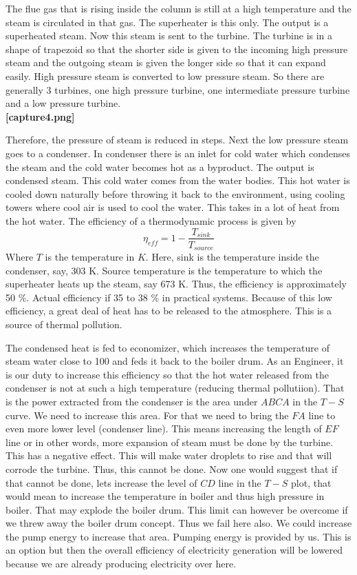 \documentclass{report}
\begin{document}
\par The flue gas that is rising inside the column is still at a high temperature and the steam is circulated in that gas. The superheater is this only. The output is a superheated steam. Now this steam is sent to the turbine.  The turbine is in a shape of trapezoid so that the shorter side is given to the incoming high pressure steam and the outgoing steam is given the longer side so that it can expand easily. High pressure steam is converted to low pressure steam. So there are generally 3 turbines, one high pressure turbine, one intermediate pressure turbine and a low pressure turbine. 
\\ {\bf [capture4.png]}
\par Therefore, the pressure of steam is reduced in steps. Next the low pressure steam goes to a condenser. In condenser there is an inlet for cold water which condenses the steam and the cold water becomes hot as a byproduct. The output is condensed steam. This cold water comes from the water bodies. This hot water is cooled down naturally before throwing it back to the environment, using cooling towers where cool air is used to cool the water. This takes in a lot of heat from the hot water. 
The efficiency of a thermodynamic process is given by
\begin{equation}
\displaystyle \eta_{eff} = 1 - \frac{T_{sink}}{T_{source}}
\end{equation}
Where $T$ is the temperature in $K$. Here, sink is the temperature inside the condenser, say, 303 K. Source temperature is the temperature to which the superheater heats up the steam, say 673 K. Thus, the efficiency is  approximately 50 \%. Actual efficiency if 35 to 38 \% in practical systems. Because of this low efficiency, a great deal of heat has to be released to the atmosphere. This is a source of thermal pollution. 

\par The condensed heat is fed to economizer, which increases the temperature of steam water close to 100 and feds it back to the boiler drum. As an Engineer, it is our duty to increase this efficiency so that the hot water released from the condenser is not at such a high temperature (reducing thermal pollutiion). That is the power extracted from the condenser is the area under $ABCA$ in the $T-S$ curve. We need to increase this area. For that we need to bring the $FA$ line to even more lower level (condenser line). This means increasing the length of $EF$ line or in other words,  more expansion of steam must be done by the turbine. This has a negative effect. This will make water droplets to rise and that will corrode the turbine. Thus, this cannot be done. Now one would suggest that if that cannot be done, lets increase the level of $CD$ line in the $T-S$ plot, that would mean to increase the temperature in boiler and thus high pressure in boiler. That may explode the boiler drum.  This limit can however be overcome if we threw away the boiler drum concept. Thus we fail here also. We could increase the pump energy to increase that area. Pumping energy is provided by us. This is an option but then the overall efficiency of electricity generation will be lowered because we are already producing electricity over here.
\end{document}
